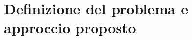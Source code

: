 \chapter{Definizione del problema e approccio proposto}\label{cha:Definizione_del_problema_e_approccio_proposto}









%